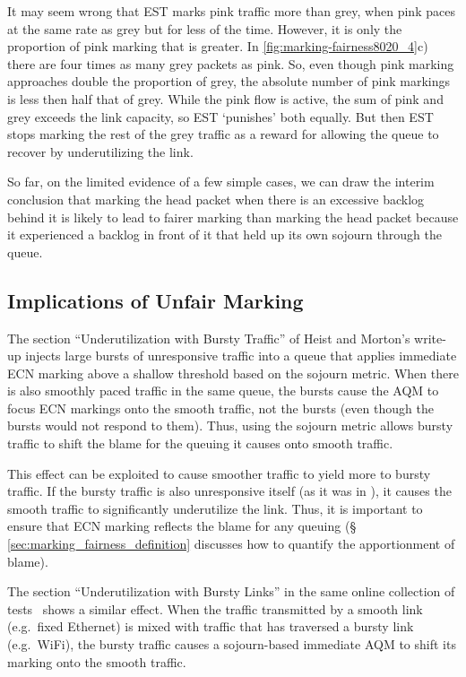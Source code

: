 It may seem wrong that EST marks pink traffic more than grey, when pink paces at the same rate as grey but for less of the time. However, it is only the proportion of pink marking that is greater. In \autoref{fig:marking-fairness8020_4}c) there are four times as many grey packets as pink. So, even though pink marking approaches double the proportion of grey, the absolute number of pink markings is less then half that of grey. While the pink flow is active, the sum of pink and grey exceeds the link capacity, so EST `punishes' both equally. But then EST stops marking the rest of the grey traffic as a reward for allowing the queue to recover by underutilizing the link.

So far, on the limited evidence of a few simple cases, we can draw the interim conclusion that marking the head packet when there is an excessive backlog behind it is likely to lead to fairer marking than marking the head packet because it experienced a backlog in front of it that held up its own sojourn through the queue. 

\subsection{Implications of Unfair Marking}\label{sec:effects_unfair_marking}

The section ``Underutilization with Bursty Traffic'' of Heist and Morton's write-up \cite{Heist20:L4S_tests} injects large bursts of unresponsive traffic into a queue that applies immediate ECN marking above a shallow threshold based on the sojourn metric. When there is also smoothly paced traffic in the same queue, the bursts cause the AQM to focus ECN markings onto the smooth traffic, not the bursts (even though the bursts would not respond to them). Thus, using the sojourn metric allows bursty traffic to shift the blame for the queuing it causes onto smooth traffic.

This effect can be exploited to cause smoother traffic to yield more to bursty traffic. If the bursty traffic is also unresponsive itself (as it was in \cite{Heist20:L4S_tests}), it causes the smooth traffic to significantly underutilize the link. Thus, it is important to ensure that ECN marking reflects the blame for any queuing (\S\,\ref{sec:marking_fairness_definition} discusses how to quantify the apportionment of blame).

The section ``Underutilization with Bursty Links'' in the same online collection of tests~\cite{Heist20:L4S_tests} shows a similar effect. When the traffic transmitted by a smooth link (e.g.\ fixed Ethernet) is mixed with traffic that has traversed a bursty link (e.g.\ WiFi), the bursty traffic causes a sojourn-based immediate AQM to shift its marking onto the smooth traffic.

